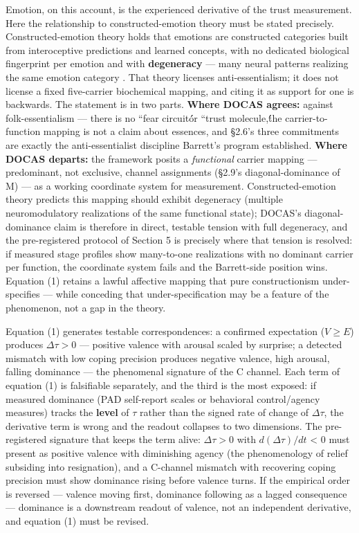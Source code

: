 \documentclass[11pt,twocolumn]{article}
\theoremstyle{plain}
\begin{document}
Emotion, on this account, is the experienced derivative of the trust measurement. Here the relationship to constructed-emotion theory must be stated precisely. Constructed-emotion theory holds that emotions are constructed categories built from interoceptive predictions and learned concepts, with no dedicated biological fingerprint per emotion and with \textbf{degeneracy} — many neural patterns realizing the same emotion category \citep{barrett2017a,barrett2017b,barrett2015}. That theory licenses anti-essentialism; it does not license a fixed five-carrier biochemical mapping, and citing it as support for one is backwards. The statement is in two parts. \textbf{Where DOCAS agrees:} against folk-essentialism — there is no ``fear circuit\'\' or ``trust molecule,\'\' the carrier-to-function mapping is not a claim about essences, and \S{}2.6's three commitments are exactly the anti-essentialist discipline Barrett's program established. \textbf{Where DOCAS departs:} the framework posits a \textit{functional} carrier mapping — predominant, not exclusive, channel assignments (\S{}2.9's diagonal-dominance of M) — as a working coordinate system for measurement. Constructed-emotion theory predicts this mapping should exhibit degeneracy (multiple neuromodulatory realizations of the same functional state); DOCAS's diagonal-dominance claim is therefore in direct, testable tension with full degeneracy, and the pre-registered protocol of Section 5 is precisely where that tension is resolved: if measured stage profiles show many-to-one realizations with no dominant carrier per function, the coordinate system fails and the Barrett-side position wins. Equation (1) retains a lawful affective mapping that pure constructionism under-specifies — while conceding that under-specification may be a feature of the phenomenon, not a gap in the theory.

Equation (1) generates testable correspondences: a confirmed expectation ($V \geq E$) produces $\Delta\tau > 0$ — positive valence with arousal scaled by surprise; a detected mismatch with low coping precision produces negative valence, high arousal, falling dominance — the phenomenal signature of the C channel. Each term of equation (1) is falsifiable separately, and the third is the most exposed: if measured dominance (PAD self-report scales or behavioral control/agency measures) tracks the \textbf{level} of $\tau$ rather than the signed rate of change of $\Delta\tau$, the derivative term is wrong and the readout collapses to two dimensions. The pre-registered signature that keeps the term alive: $\Delta\tau > 0$ with $d(\Delta\tau)/dt$ < 0 must present as positive valence with diminishing agency (the phenomenology of relief subsiding into resignation), and a C-channel mismatch with recovering coping precision must show dominance rising before valence turns. If the empirical order is reversed — valence moving first, dominance following as a lagged consequence — dominance is a downstream readout of valence, not an independent derivative, and equation (1) must be revised.
\end{document}
